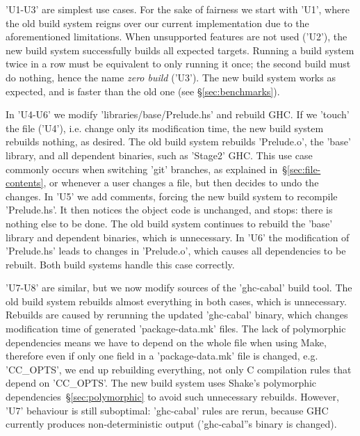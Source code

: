 \lst'U1-U3' are simplest use cases. For the sake of fairness we start with
\lst'U1', where the old build system reigns over our current implementation due
to the aforementioned limitations. When unsupported features are not used
(\lst'U2'), the new build system successfully builds all expected targets.
Running a build system twice in a row must be equivalent to only running it
once; the second build must do nothing, hence the name \emph{zero
build} (\lst'U3'). The new build system works as expected, and is faster
than the old one (see \S\ref{sec:benchmarks}).


In \lst'U4-U6' we modify \lst'libraries/base/Prelude.hs' and rebuild GHC.
If we \lst'touch' the file (\lst'U4'), i.e. change only its modification
time, the new build system rebuilds nothing, as desired. The old build system rebuilds
\lst'Prelude.o', the \lst'base' library, and all dependent binaries, such as
\lst'Stage2' GHC. This use case commonly occurs when switching \lst'git'
branches, as explained in~\S\ref{sec:file-contents}, or whenever a user changes
a file, but then decides to undo the changes. In \lst'U5' we add comments,
forcing the new build system to recompile \lst'Prelude.hs'. It then notices the
object code is unchanged, and stops: there is nothing else to be done. The old
build system continues to rebuild the \lst'base' library and dependent binaries,
which is unnecessary. In \lst'U6' the modification of \lst'Prelude.hs' leads to
changes in \lst'Prelude.o', which causes all dependencies to be rebuilt. Both
build systems handle this case correctly.

\lst'U7-U8' are similar, but we now modify sources of the \lst'ghc-cabal' build
tool. The old build system rebuilds almost everything in both cases,
which is unnecessary. Rebuilds are caused by rerunning the updated \lst'ghc-cabal'
binary, which changes modification time of generated \lst'package-data.mk'
files. The lack of polymorphic dependencies means we have to depend on the whole
file when using Make, therefore even if only one field in a
\lst'package-data.mk' file is changed, e.g. \lst'CC_OPTS', we end up
rebuilding everything, not only C compilation rules that depend on
\lst'CC_OPTS'. The new build system uses Shake's polymorphic
dependencies~\S\ref{sec:polymorphic} to avoid such unnecessary rebuilds. However,
\lst'U7' behaviour is still suboptimal: \lst'ghc-cabal' rules
are rerun, because GHC currently produces non-deterministic output
(\lst'ghc-cabal''s binary is changed).

